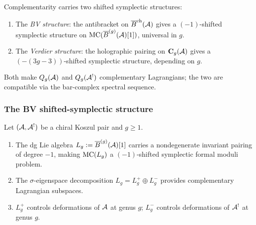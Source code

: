 \begin{remark}
Complementarity carries two shifted symplectic structures:
\begin{enumerate}[label=\textup{(\roman*)}]
\item The \emph{BV structure}: the antibracket on
 $\overline{B}^{\mathrm{ch}}(\mathcal{A})$ gives a $(-1)$-shifted symplectic
 structure on $\mathrm{MC}(\overline{B}^{(g)}(\mathcal{A})[1])$, universal in $g$.
\item The \emph{Verdier structure}: the holographic pairing on
 $\mathbf{C}_g(\mathcal{A})$ gives a $(-(3g-3))$-shifted symplectic
 structure, depending on $g$.
\end{enumerate}
Both make $Q_g(\mathcal{A})$ and $Q_g(\mathcal{A}^!)$ complementary Lagrangians;
the two are compatible via the bar-complex spectral sequence.
\end{remark}

\subsubsection{The BV shifted-symplectic structure}

\begin{theorem}
\label{thm:thqg-III-bv-lagrangian}
Let $(\mathcal{A}, \mathcal{A}^!)$ be a chiral Koszul pair and $g \ge 1$.
\begin{enumerate}[label=\textup{(\roman*)}]
\item The dg Lie algebra
 $L_g := \overline{B}^{(g)}(\mathcal{A})[1]$ carries a nondegenerate
 invariant pairing of degree $-1$, making $\mathrm{MC}(L_g)$
 a $(-1)$-shifted symplectic formal moduli problem.

\item The $\sigma$-eigenspace decomposition
 $L_g = L_g^+ \oplus L_g^-$ provides complementary
 Lagrangian subspaces.

\item $L_g^+$ controls deformations of $\mathcal{A}$ at genus $g$;
 $L_g^-$ controls deformations of $\mathcal{A}^!$ at genus $g$.
\end{enumerate}
\end{theorem}

